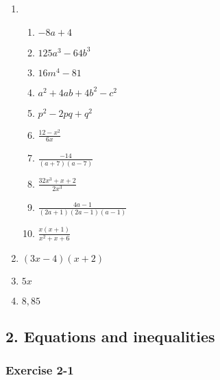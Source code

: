 {\begin{multicols}{3}
\begin{enumerate}[noitemsep, label=\textbf{\arabic*}. ]
\item %

\begin{enumerate}[noitemsep, label=\textbf{(\alph*)} ] 

\item$-8a + 4$%
\item $125a^3 - 64b^3$ %
\item $16m^4 - 81$%
\item $a^2 + 4ab + 4b^2 - c^2$%
\item $p^2 - 2pq +q^2$%
\item $\frac{12 - x^2}{6x}$%
\item $\frac{-14}{(a+7)(a-7)}$
\item $\frac{32x^3+x+2}{2x^3}$
\item $\frac{4a-1}{(2a+1)(2a-1)(a-1)}$
\item $\frac{x(x+1)}{x^2+x+6}$
\end{enumerate}


\item $(3x - 4)(x + 2)$%
\item $5x$%
\item $8,85$ %
\end{enumerate}

\end{multicols}


\subsection* {2. Equations and inequalities}
\subsubsection*{Exercise 2-1} %

}
